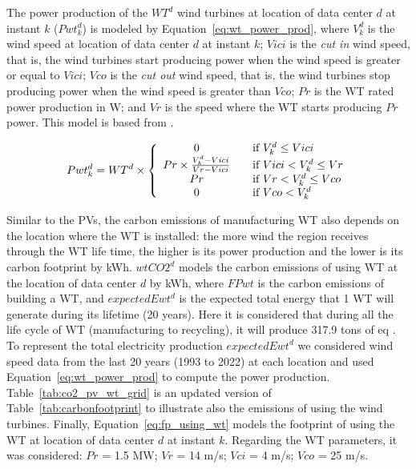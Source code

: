 The power production of the $WT^d$ wind turbines at location of data center $d$ at instant $k$ ($Pwt^d_{k}$) is modeled by Equation~\ref{eq:wt_power_prod}, where $V^d_k$ is the wind speed at location of data center $d$ at instant $k$; $Vici$ is the \textit{cut in} wind speed, that is, the wind turbines start producing power when the wind speed is greater or equal to $Vici$; $Vco$ is the \textit{cut out} wind speed, that is, the wind turbines stop producing power when the wind speed is greater than $Vco$; $Pr$ is the WT rated power production in W; and $Vr$ is the speed where the WT starts producing $Pr$ power. This model is based from \cite{HADDAD2021100505}.

\begin{equation} \label{eq:wt_power_prod}
Pwt^d_{k} = WT^d \times \left\{ 
  \begin{array}{ c l }
    0   & \quad \textrm{if } V^d_k \leq Vici \\
    Pr \times \frac{V^d_k - Vici}{Vr - Vici}  & \quad \textrm{if } Vici < V^d_k \leq Vr \\
    Pr  & \quad \textrm{if } Vr < V^d_k \leq Vco \\
    0  & \quad \textrm{if } Vco < V^d_k \\
  \end{array}
\right.
\end{equation}

Similar to the PVs, the carbon emissions of manufacturing WT also depends on the location where the WT is installed: the more wind the region receives through the WT life time, the higher is its power production and the lower is its carbon footprint by kWh. $wtCO2^d$ models the carbon emissions of using WT at the location of data center $d$ by kWh, where $FPwt$ is the carbon emissions of building a WT, and $expectedEwt^d$ is the expected total energy that 1 WT will generate during its lifetime (20 years). Here it is considered that 
during all the life cycle of WT (manufacturing to recycling), it will produce 317.9 tons of  eq \cite{li2020_wtlca}. To represent the total electricity production $expectedEwt^d$ we considered wind speed data from the last 20 years (1993 to 2022) at each location and used Equation~\eqref{eq:wt_power_prod} to compute the power production. Table~\ref{tab:co2_pv_wt_grid} is an updated version of Table~\ref{tab:carbonfootprint} to illustrate also the emissions of using the wind turbines. Finally, Equation~\eqref{eq:fp_using_wt} models the footprint of using the WT at location of data center $d$ at instant $k$. Regarding the WT parameters, it was considered: $Pr$ = 1.5 MW; $Vr$ = 14 m/s; $Vci$ = 4 m/s; $Vco$ = 25 m/s.
 
